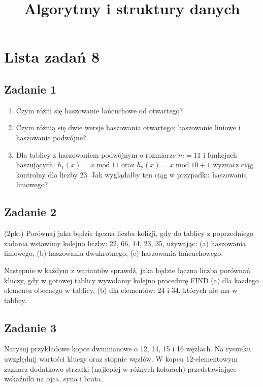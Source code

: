 \documentclass{article}
\begin{document}
\title{Algorytmy i struktury danych}
\author{}
\date{}
\maketitle

\section*{Lista zadań 8}

\subsection*{Zadanie 1}
\begin{enumerate}[label=(\alph*)]
	\item  Czym różni się haszowanie łańcuchowe od otwartego?
	\item Czym różnią się  dwie wersje haszowania otwartego:  haszowanie liniowe i haszowanie podwójne?
	\item  Dla tablicy z haszowaniem podwójnym o rozmiarze $m=11$ i funkcjach haszujących:
	      $h_1(x)=x \mathop{\mathrm{mod}} 11$  oraz $h_2(x)= x \mathop{\mathrm{mod}} 10+1$ wyznacz ciąg kontrolny
	      dla liczby 23.
	      Jak wyglądałby ten ciąg w przypadku haszowania liniowego?
\end{enumerate}

\subsection*{Zadanie 2}
(2pkt) Porównaj jaka będzie łączna liczba kolizji, gdy do tablicy z poprzedniego zadania wstawimy kolejno liczby:
22, 66, 44, 23, 35,  używając: (a) haszowania liniowego, (b) haszowania dwukrotnego, (c) haszowania łańcuchowego.

\noindent
Następnie w każdym z wariantów sprawdź, jaka będzie łączna liczba porównań kluczy, gdy w gotowej tablicy wywołamy
kolejno procedurę FIND (a) dla każdego elementu obecnego w tablicy, (b) dla elementów: 24 i 34, których nie ma w tablicy.

\subsection*{Zadanie 3}
Narysuj przykładowe kopce dwumianowe o 12, 14, 15 i 16 węzłach. Na rysunku uwzględnij wartości kluczy oraz stopnie
węzłów. W kopcu 12-elementowym zaznacz dodatkowo strzałki (najlepiej w różnych kolorach) przedstawiające wskaźniki
na ojca, syna i brata.
\end{document}
